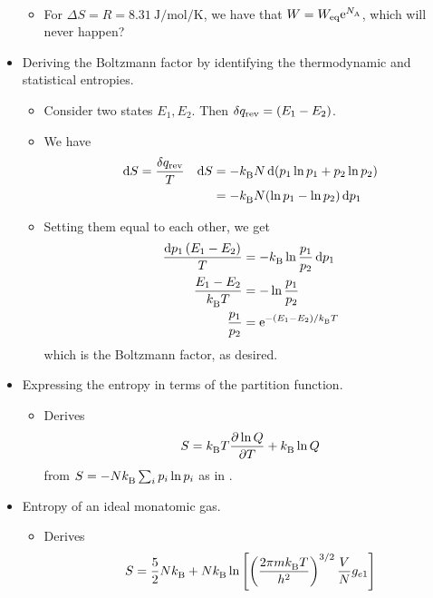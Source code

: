 \documentclass[../notes.tex]{subfiles}
\begin{document}
\begin{itemize}
\begin{itemize}
\begin{align*}
        \end{align*}
        \item For $\Delta S=R=\SI{8.31}{\joule\per\mole\per\kelvin}$, we have that $W=W_\text{eq}\e[\NA]$, which will never happen?
    \end{itemize}
    \item Deriving the Boltzmann factor by identifying the thermodynamic and statistical entropies.
    \begin{itemize}
        \item Consider two states $E_1,E_2$. Then $\var{q_\text{rev}}=(E_1-E_2)$.
        \item We have
        \begin{align*}
            \dd{S} &= \frac{\var{q_\text{rev}}}{T}&
                \dd{S} &= -\kB N\dd{(p_1\ln p_1+p_2\ln p_2)}\\
            &&
                &= -\kB N(\ln p_1-\ln p_2)\dd{p_1}
        \end{align*}
        \item Setting them equal to each other, we get
        \begin{align*}
            \frac{\dd{p_1}(E_1-E_2)}{T} &= -\kB\ln\frac{p_1}{p_2}\dd{p_1}\\
            \frac{E_1-E_2}{\kB T} &= -\ln\frac{p_1}{p_2}\\
            \frac{p_1}{p_2} &= \e[-(E_1-E_2)/\kB T]
        \end{align*}
        which is the Boltzmann factor, as desired.
    \end{itemize}
    \item Expressing the entropy in terms of the partition function.
    \begin{itemize}
        \item Derives
        \begin{equation*}
            S = \kB T\pdv{\ln Q}{T}+\kB\ln Q
        \end{equation*}
        from $S=-N\kB\sum_ip_i\ln p_i$ as in \textcite{bib:McQuarrieSimon}.
    \end{itemize}
    \item Entropy of an ideal monatomic gas.
    \begin{itemize}
        \item Derives
        \begin{equation*}
            S = \frac{5}{2}N\kB+N\kB\ln\left[ \left( \frac{2\pi m\kB T}{h^2} \right)^{3/2}\frac{V}{N}g_{e1} \right]
        \end{equation*}

\end{itemize}
\end{itemize}
\end{document}
